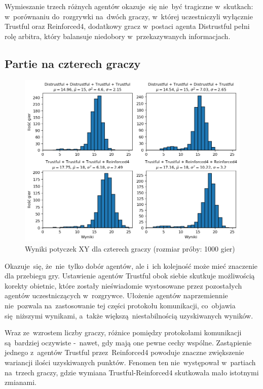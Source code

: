 \documentclass[declaration,shortabstract,inz]{iithesis}
\begin{document}
Wymieszanie trzech różnych agentów okazuje~się nie~być tragiczne w~skutkach: w~porównaniu do~rozgrywki na~dwóch graczy, w~której uczestniczyli wyłącznie Trustful oraz Reinforced4, dodatkowy gracz w~postaci agenta Distrustful pełni rolę arbitra, który balansuje niedobory w~przekazywanych informacjach.

\subsection*{Partie na czterech graczy}

\begin{figure}[H]
	\centering
	\captionsetup{format=hang}
	\includegraphics[width=\textwidth,height=\textheight,keepaspectratio]{XY4.png}
	\caption[Caption]{Wyniki potyczek XY dla czterech graczy (rozmiar próby: 1000 gier)}
	\label{fig:XY4}
\end{figure}

Okazuje~się, że~nie~tylko dobór agentów, ale i~ich kolejność może mieć znaczenie dla przebiegu gry. Ustawienie agentów Trustful obok siebie skutkuje możliwością korekty obietnic, które zostały nieświadomie wystosowane przez pozostałych agentów uczestniczących w~rozgrywce. Ułożenie agentów naprzemiennie nie~pozwala na~zastosowanie tej części protokołu komunikacji, co~objawia się~niższymi wynikami, a~także większą niestabilnością uzyskiwanych wyników.

Wraz ze~wzrostem liczby graczy, różnice pomiędzy protokołami komunikacji są~bardziej oczywiste -~nawet, gdy mają one pewne cechy wspólne. Zastąpienie jednego z~agentów Trustful przez~Reinforced4 powoduje znaczne zwiększenie wariancji ilości uzyskiwanych punktów. Fenomen ten nie~występował w~partiach na~trzech graczy, gdzie wymiana Trustful-Reinforced4 skutkowała mało istotnymi zmianami.
\end{document}
